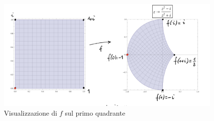 \begin{example}
\begin{enumerate}
      \begin{figure}[h]
        \centering
        \includegraphics[width=0.6\linewidth]{images/analisi_complessa/es_mappa_conforme5.png}
        \caption{Visualizzazione di $f$ sul primo quadrante}
        \label{fig:mappe_conformi_esempio4}
      \end{figure}
  \end{enumerate}
\end{example}

